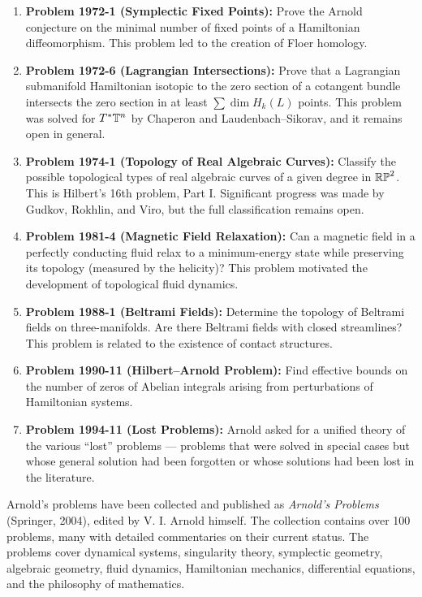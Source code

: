 \begin{enumerate}
    \item \textbf{Problem 1972-1 (Symplectic Fixed Points):} Prove the Arnold conjecture on the minimal number of fixed points of a Hamiltonian diffeomorphism. This problem led to the creation of Floer homology.
    \item \textbf{Problem 1972-6 (Lagrangian Intersections):} Prove that a Lagrangian submanifold Hamiltonian isotopic to the zero section of a cotangent bundle intersects the zero section in at least \(\sum \dim H_k(L)\) points. This problem was solved for \(T^*\mathbb{T}^n\) by Chaperon and Laudenbach--Sikorav, and it remains open in general.
    \item \textbf{Problem 1974-1 (Topology of Real Algebraic Curves):} Classify the possible topological types of real algebraic curves of a given degree in \(\mathbb{RP}^2\). This is Hilbert's 16th problem, Part I. Significant progress was made by Gudkov, Rokhlin, and Viro, but the full classification remains open.
    \item \textbf{Problem 1981-4 (Magnetic Field Relaxation):} Can a magnetic field in a perfectly conducting fluid relax to a minimum-energy state while preserving its topology (measured by the helicity)? This problem motivated the development of topological fluid dynamics.
    \item \textbf{Problem 1988-1 (Beltrami Fields):} Determine the topology of Beltrami fields on three-manifolds. Are there Beltrami fields with closed streamlines? This problem is related to the existence of contact structures.
    \item \textbf{Problem 1990-11 (Hilbert--Arnold Problem):} Find effective bounds on the number of zeros of Abelian integrals arising from perturbations of Hamiltonian systems.
    \item \textbf{Problem 1994-11 (Lost Problems):} Arnold asked for a unified theory of the various ``lost'' problems --- problems that were solved in special cases but whose general solution had been forgotten or whose solutions had been lost in the literature.
\end{enumerate}

Arnold's problems have been collected and published as \textit{Arnold's Problems} (Springer, 2004), edited by V. I. Arnold himself. The collection contains over 100 problems, many with detailed commentaries on their current status. The problems cover dynamical systems, singularity theory, symplectic geometry, algebraic geometry, fluid dynamics, Hamiltonian mechanics, differential equations, and the philosophy of mathematics.

